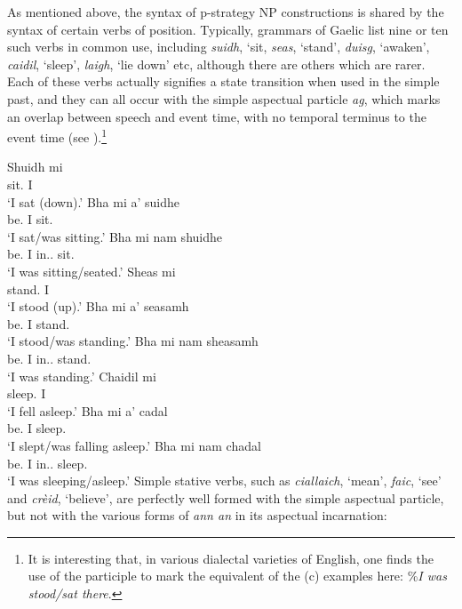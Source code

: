 \documentclass[output=paper]{langsci/langscibook}
\begin{document}
As mentioned above, the syntax of p-strategy NP  constructions is
shared by the syntax of certain verbs of position. Typically, grammars of
Gaelic list nine or ten such verbs in common use, including \emph{suidh}, `sit,
\emph{seas}, `stand', \emph{duisg}, `awaken', \emph{caidil}, `sleep',
\emph{laigh}, `lie down' etc, although there are others which are rarer. Each
of these verbs actually signifies a state transition when used in the simple
past, and they can all occur with the simple aspectual particle \emph{ag},
which marks an overlap between speech and event time, with no temporal terminus
to the event time (see \citealt{adger:96,ramchand:97}).\footnote{It
is interesting that, in various dialectal varieties of English, one finds the
use of the  participle to mark the equivalent of the (c) examples here:
\%\emph{I was stood/sat there}.}

\ea {}
\ea \gll Shuidh mi\\
sit.\Pst{} I\\
\glt \enquote*{I sat (down).}
\ex \gll Bha mi a' suidhe\\
be.\Pst{} I \Simp{} sit.\Vn{}\\
\glt \enquote*{I sat/was sitting.}
\ex \gll Bha mi nam shuidhe\\
be.\Pst{} I in.\Poss.\Fsg{} sit.\Vn{}\\
\glt \enquote*{I was sitting/seated.}
\z
\ex {}
\ea \gll  Sheas mi\\
stand.\Pst{} I\\
\glt \enquote*{I stood (up).}
\ex \gll  Bha mi a' seasamh\\
be.\Pst{} I \Simp{} stand.\Vn{}\\
\glt \enquote*{I stood/was standing.}
\ex \gll  Bha mi nam sheasamh\\
be.\Pst{} I in.\Poss.\Fsg{} stand.\Vn{}\\
\glt \enquote*{I was standing.}\label{nam-sheasamh}
\z
\ex {}
\ea \gll  Chaidil mi\\
sleep.\Pst{} I\\
\glt \enquote*{I fell asleep.}
\ex \gll Bha mi a' cadal\\
be.\Pst{} I \Simp{} sleep.\Vn{}\\
\glt \enquote*{I slept/was falling asleep.}
\ex \gll Bha mi nam chadal\\
be.\Pst{} I in.\Poss.\Fsg{} sleep.\Vn{}\\
\glt \enquote*{I was sleeping/asleep.}
\z
\z
Simple stative verbs, such as \emph{ciallaich}, `mean', \emph{faic}, `see' and
\emph{cr\`eid}, `believe', are perfectly well formed with the simple aspectual
particle, but not with the various forms of \emph{ann an} in its aspectual
incarnation:
\end{document}
